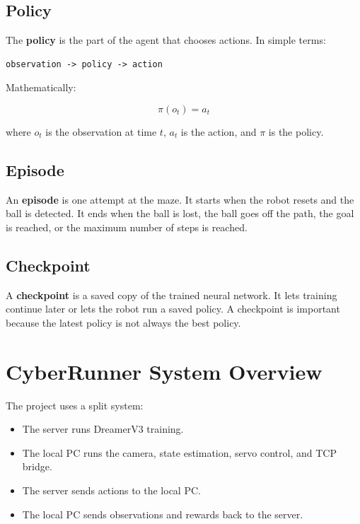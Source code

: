 \documentclass[11pt]{article}
\begin{document}
\subsection{Policy}

The \textbf{policy} is the part of the agent that chooses actions. In simple terms:

\begin{lstlisting}
observation -> policy -> action
\end{lstlisting}

Mathematically:

\begin{equation}
\pi(o_t) = a_t
\end{equation}

where $o_t$ is the observation at time $t$, $a_t$ is the action, and $\pi$ is the policy.

\subsection{Episode}

An \textbf{episode} is one attempt at the maze. It starts when the robot resets and the ball is detected. It ends when the ball is lost, the ball goes off the path, the goal is reached, or the maximum number of steps is reached.

\subsection{Checkpoint}

A \textbf{checkpoint} is a saved copy of the trained neural network. It lets training continue later or lets the robot run a saved policy. A checkpoint is important because the latest policy is not always the best policy.

\section{CyberRunner System Overview}

The project uses a split system:

\begin{itemize}[leftmargin=*]
  \item The server runs DreamerV3 training.
  \item The local PC runs the camera, state estimation, servo control, and TCP bridge.
  \item The server sends actions to the local PC.
  \item The local PC sends observations and rewards back to the server.
\end{itemize}
\end{document}
